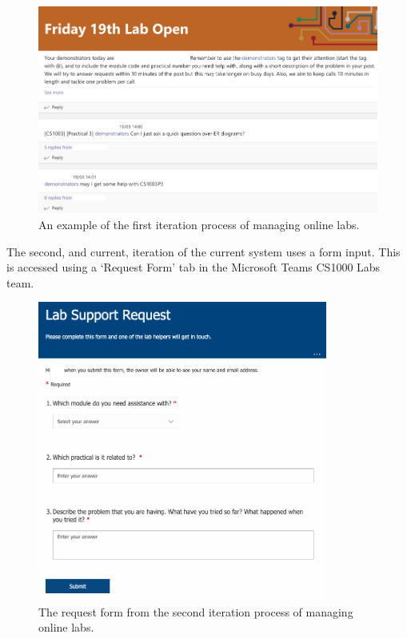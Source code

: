 \FloatBarrier
\begin{figure}[H]
  \centering
  \includegraphics[width=\textwidth]{2context/images/teams1.png}
  \caption{An example of the first iteration process of managing online labs.}
\end{figure}

The second, and current, iteration of the current system uses a form input. This is accessed using a `Request Form' tab in the Microsoft Teams \cite{teams} CS1000 Labs team. 

\FloatBarrier
\begin{figure}[H]
  \centering
  \includegraphics[width=0.85\textwidth]{2context/images/teams2a.png}
  \caption{The request form from the second iteration process of managing online labs.}
\end{figure}

